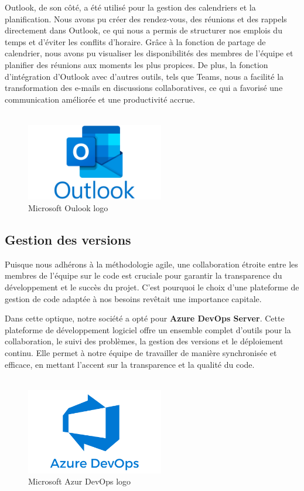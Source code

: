 Outlook, de son côté, a été utilisé pour la gestion des calendriers et la planification. Nous avons pu créer des rendez-vous, des réunions et des rappels directement dans Outlook, ce qui nous a permis de structurer nos emplois du temps et d'éviter les conflits d'horaire. Grâce à la fonction de partage de calendrier, nous avons pu visualiser les disponibilités des membres de l'équipe et planifier des réunions aux moments les plus propices. De plus, la fonction d'intégration d'Outlook avec d'autres outils, tels que Teams, nous a facilité la transformation des e-mails en discussions collaboratives, ce qui a favorisé une communication améliorée et une productivité accrue.
\\
\\
\begin{figure}[H]
    \centering
    \includegraphics[width=6cm]{Figures/outlook.png}
    \caption{Microsoft Oulook logo}
\end{figure}



\subsection{Gestion des versions}

Puisque nous adhérons à la méthodologie agile, une collaboration étroite entre les membres de l'équipe sur le code est cruciale pour garantir la transparence du développement et le succès du projet. C'est pourquoi le choix d'une plateforme de gestion de code adaptée à nos besoins revêtait une importance capitale.

Dans cette optique, notre société a opté pour \textbf{Azure DevOps Server}. Cette plateforme de développement logiciel offre un ensemble complet d'outils pour la collaboration, le suivi des problèmes, la gestion des versions et le déploiement continu. Elle permet à notre équipe de travailler de manière synchronisée et efficace, en mettant l'accent sur la transparence et la qualité du code.
\\
\\
\begin{figure}[H]
    \centering
    \includegraphics[width=6cm]{Figures/azur.png}
    \caption{Microsoft Azur DevOps logo}
\end{figure}


